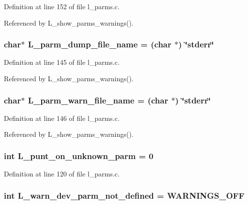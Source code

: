 Definition at line 152 of file l\_\-parms.c.

Referenced by L\_\-show\_\-parms\_\-warnings().
\subsubsection{\setlength{\rightskip}{0pt plus 5cm}char$\ast$ \bf{L\_\-parm\_\-dump\_\-file\_\-name} = (char $\ast$) \char`\"{}stderr\char`\"{}}\label{l__parms_8c_3b83d33abb46fadfb813372c0b9a667f}




Definition at line 145 of file l\_\-parms.c.

Referenced by L\_\-show\_\-parms\_\-warnings().
\subsubsection{\setlength{\rightskip}{0pt plus 5cm}char$\ast$ \bf{L\_\-parm\_\-warn\_\-file\_\-name} = (char $\ast$) \char`\"{}stderr\char`\"{}}\label{l__parms_8c_a52c8258549d23615859be45e5f2a38c}




Definition at line 146 of file l\_\-parms.c.

Referenced by L\_\-show\_\-parms\_\-warnings().
\subsubsection{\setlength{\rightskip}{0pt plus 5cm}int \bf{L\_\-punt\_\-on\_\-unknown\_\-parm} = 0}\label{l__parms_8c_38db30290d33f5904a0c1859d7ae7d21}




Definition at line 120 of file l\_\-parms.c.
\subsubsection{\setlength{\rightskip}{0pt plus 5cm}int \bf{L\_\-warn\_\-dev\_\-parm\_\-not\_\-defined} = WARNINGS\_\-OFF}\label{l__parms_8c_e4e406bd7aa9be4a24b2a33ea728e4db}




